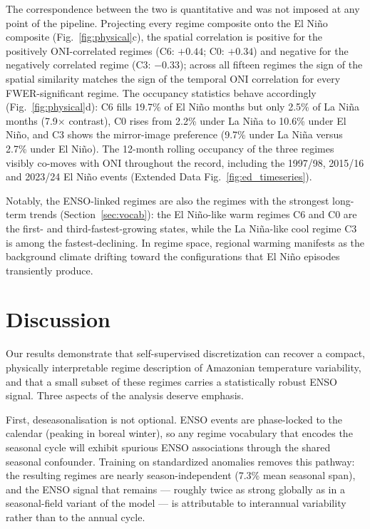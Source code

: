 \documentclass[pdflatex,sn-nature]{sn-jnl}
\begin{document}
The correspondence between the two is quantitative and was not imposed at any point of the pipeline. Projecting every regime composite onto the El Ni\~no composite (Fig.~\ref{fig:physical}c), the spatial correlation is positive for the positively ONI-correlated regimes (C6: $+0.44$; C0: $+0.34$) and negative for the negatively correlated regime (C3: $-0.33$); across all fifteen regimes the sign of the spatial similarity matches the sign of the temporal ONI correlation for every FWER-significant regime. The occupancy statistics behave accordingly (Fig.~\ref{fig:physical}d): C6 fills 19.7\% of El Ni\~no months but only 2.5\% of La Ni\~na months (7.9$\times$ contrast), C0 rises from 2.2\% under La Ni\~na to 10.6\% under El Ni\~no, and C3 shows the mirror-image preference (9.7\% under La Ni\~na versus 2.7\% under El Ni\~no). The 12-month rolling occupancy of the three regimes visibly co-moves with ONI throughout the record, including the 1997/98, 2015/16 and 2023/24 El Ni\~no events (Extended Data Fig.~\ref{fig:ed_timeseries}).

Notably, the ENSO-linked regimes are also the regimes with the strongest long-term trends (Section~\ref{sec:vocab}): the El Ni\~no-like warm regimes C6 and C0 are the first- and third-fastest-growing states, while the La Ni\~na-like cool regime C3 is among the fastest-declining. In regime space, regional warming manifests as the background climate drifting toward the configurations that El Ni\~no episodes transiently produce.

\section{Discussion}\label{sec:discussion}

Our results demonstrate that self-supervised discretization can recover a compact, physically interpretable regime description of Amazonian temperature variability, and that a small subset of these regimes carries a statistically robust ENSO signal. Three aspects of the analysis deserve emphasis.

First, deseasonalisation is not optional. ENSO events are phase-locked to the calendar (peaking in boreal winter), so any regime vocabulary that encodes the seasonal cycle will exhibit spurious ENSO associations through the shared seasonal confounder. Training on standardized anomalies removes this pathway: the resulting regimes are nearly season-independent (7.3\% mean seasonal span), and the ENSO signal that remains --- roughly twice as strong globally as in a seasonal-field variant of the model --- is attributable to interannual variability rather than to the annual cycle.
\end{document}
